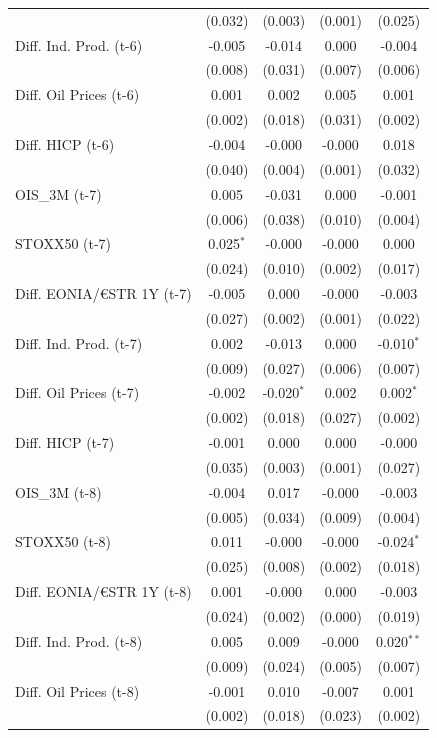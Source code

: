 \begin{longtable}[t]{lcccc}
 & (0.032) & (0.003) & (0.001) & (0.025)\\
Diff. Ind. Prod. (t-6) & -0.005 & -0.014 & 0.000 & -0.004\\
 & (0.008) & (0.031) & (0.007) & (0.006)\\
Diff. Oil Prices (t-6) & 0.001 & 0.002 & 0.005 & 0.001\\
 & (0.002) & (0.018) & (0.031) & (0.002)\\
Diff. HICP (t-6) & -0.004 & -0.000 & -0.000 & 0.018\\
 & (0.040) & (0.004) & (0.001) & (0.032)\\
OIS\_3M (t-7) & 0.005 & -0.031 & 0.000 & -0.001\\
 & (0.006) & (0.038) & (0.010) & (0.004)\\
STOXX50 (t-7) & 0.025$^{*}$ & -0.000 & -0.000 & 0.000\\
 & (0.024) & (0.010) & (0.002) & (0.017)\\
Diff. EONIA/€STR 1Y (t-7) & -0.005 & 0.000 & -0.000 & -0.003\\
 & (0.027) & (0.002) & (0.001) & (0.022)\\
Diff. Ind. Prod. (t-7) & 0.002 & -0.013 & 0.000 & -0.010$^{*}$\\
 & (0.009) & (0.027) & (0.006) & (0.007)\\
Diff. Oil Prices (t-7) & -0.002 & -0.020$^{*}$ & 0.002 & 0.002$^{*}$\\
 & (0.002) & (0.018) & (0.027) & (0.002)\\
Diff. HICP (t-7) & -0.001 & 0.000 & 0.000 & -0.000\\
 & (0.035) & (0.003) & (0.001) & (0.027)\\
OIS\_3M (t-8) & -0.004 & 0.017 & -0.000 & -0.003\\
 & (0.005) & (0.034) & (0.009) & (0.004)\\
STOXX50 (t-8) & 0.011 & -0.000 & -0.000 & -0.024$^{*}$\\
 & (0.025) & (0.008) & (0.002) & (0.018)\\
Diff. EONIA/€STR 1Y (t-8) & 0.001 & -0.000 & 0.000 & -0.003\\
 & (0.024) & (0.002) & (0.000) & (0.019)\\
Diff. Ind. Prod. (t-8) & 0.005 & 0.009 & -0.000 & 0.020$^{**}$\\
 & (0.009) & (0.024) & (0.005) & (0.007)\\
Diff. Oil Prices (t-8) & -0.001 & 0.010 & -0.007 & 0.001\\
 & (0.002) & (0.018) & (0.023) & (0.002)\\

\end{longtable}
